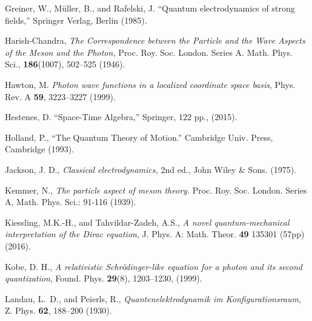 \documentclass[12pt]{article}
\theoremstyle{definition}
\numberwithin{equation}{section}
\begin{document}
\begin{thebibliography}{[KTZ2020]}
  Greiner, W.,
  M\"uller, B.,
  and
  Rafelski, J.
  ``Quantum electrodynamics of strong fields,''
  Springer Verlag, Berlin (1985).\vspace{-4pt}

 Harish-Chandra,
 {\it The Correspondence between the Particle and the Wave Aspects of the Meson and the Photon,} 
 Proc. Roy. Soc. London. Series A. Math. Phys. Sci., {\bf 186}(1007), 502--525 (1946).\vspace{-4pt}

  Hawton, M.
  \textit{Photon wave functions in a localized coordinate space basis},
  Phys. Rev. A \textbf{59}, 3223--3227 (1999). \vspace{-4pt}

Hestenes, D. 
    ``Space-Time Algebra,''
  Springer, 122 pp.,  (2015).\vspace{-4pt}

 Holland, P.,
  ``The Quantum Theory of Motion.''
  Cambridge Univ. Press, Cambridge (1993).

  Jackson, J. D., 
 \textit{Classical electrodynamics,} 2nd ed., John Wiley \& Sons. (1975).\vspace{-4pt}

Kemmer, N., 
\textit{The particle aspect of meson theory.}
 Proc. Roy. Soc. London. Series A, Math. Phys. Sci.: 91-116 (1939).\vspace{-4pt}



 Kiessling, M.K.-H.,
 and
 Tahvildar-Zadeh, A.S.,
 \textit{A novel quantum-mechanical interpretation of the Dirac equation},
 J. Phys. A: Math. Theor. \textbf{49} 135301 (57pp) (2016).%

\newblock Kobe, D. H., 
\newblock \textit{A relativistic Schr\"odinger-like equation for a photon and its second quantization},
\newblock Found. Phys. \textbf{29}(8), 1203--1230, (1999).


  Landau, L.~D.,
  and 
  Peierls, R.,
  {\it Quantenelektrodynamik im Konfigurationsraum}, 
  Z. Phys. \textbf{62}, 188--200 (1930).\vspace{-4pt}


\end{thebibliography}
\end{document}
